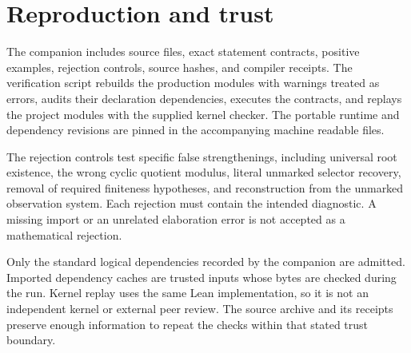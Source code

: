 \section{Reproduction and trust}
The companion includes source files, exact statement contracts, positive examples, rejection controls, source hashes, and compiler receipts. The verification script rebuilds the production modules with warnings treated as errors, audits their declaration dependencies, executes the contracts, and replays the project modules with the supplied kernel checker. The portable runtime and dependency revisions are pinned in the accompanying machine readable files.

The rejection controls test specific false strengthenings, including universal root existence, the wrong cyclic quotient modulus, literal unmarked selector recovery, removal of required finiteness hypotheses, and reconstruction from the unmarked observation system. Each rejection must contain the intended diagnostic. A missing import or an unrelated elaboration error is not accepted as a mathematical rejection.

Only the standard logical dependencies recorded by the companion are admitted. Imported dependency caches are trusted inputs whose bytes are checked during the run. Kernel replay uses the same Lean implementation, so it is not an independent kernel or external peer review. The source archive and its receipts preserve enough information to repeat the checks within that stated trust boundary.
